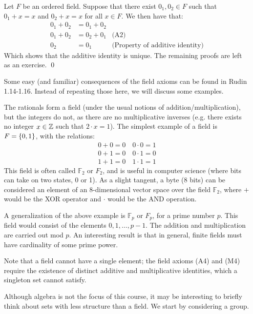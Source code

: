 \begin{nproof}
    Let $F$ be an ordered field. Suppose that there exist $0_1, 0_2 \in F$ such that $0_1 + x= x$ and $0_2 + x = x$ for all $x \in F$. We then have that:
    \begin{align*}
        0_1 + 0_2 &= 0_1 + 0_2
        \\ 0_1 + 0_2 &= 0_2 + 0_1 & \text{(A2)}
        \\ 0_2 &= 0_1 & \text{(Property of additive identity)}
    \end{align*}
    Which shows that the additive identity is unique. The remaining proofs are left as an exercise. \qed
\end{nproof}
Some easy (and familiar) consequences of the field axioms can be found in Rudin 1.14-1.16. Instead of repeating those here, we will discuss some examples. 

The rationals form a field (under the usual notions of addition/multiplication), but the integers do not, as there are no multiplicative inverses (e.g. there exists no integer $x \in \mathbb{Z}$ such that $2\cdot x = 1$). The simplest example of a field is $F = \set{0, 1}$, with the relations:
\begin{align*}
    0 + 0 = 0\quad 0\cdot0 = 1
    \\ 0 + 1 = 0 \quad 0 \cdot 1 = 0
    \\ 1 + 1 = 0 \quad 1 \cdot 1 = 1
\end{align*}
This field is often called $\mathbb{F}_2$ or $F_2$, and is useful in computer science (where bits can take on two states, 0 or 1). As a slight tangent, a byte (8 bits) can be considered an element of an 8-dimensional vector space over the field $\mathbb{F}_2$, where $+$ would be the XOR operator and $\cdot$ would be the AND operation. 

A generalization of the above example is $\mathbb{F}_p$ or $F_p$, for a prime number $p$. This field would consist of the elements $0, 1, \ldots, p-1$. The addition and multiplication are carried out mod $p$. An interesting result is that in general, finite fields must have cardinality of some prime power. 

Note that a field cannot have a single element; the field axioms (A4) and (M4) require the existence of distinct additive and multiplicative identities, which a singleton set cannot satisfy. 

Although algebra is not the focus of this course, it may be interesting to briefly think about sets with less structure than a field. We start by considering a group. 

